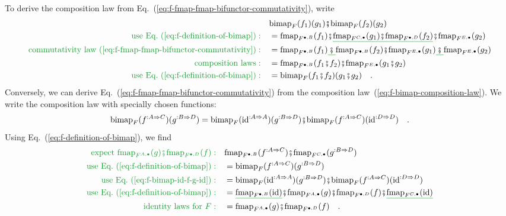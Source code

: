 To derive the composition law from Eq.~(\ref{eq:f-fmap-fmap-bifunctor-commutativity}),
write
\begin{align*}
 & \text{bimap}_{F}(f_{1})(g_{1})\bef\text{bimap}_{F}(f_{2})(g_{2})\\
{\color{greenunder}\text{use Eq.~(\ref{eq:f-definition-of-bimap})}:}\quad & =\text{fmap}_{F^{\bullet,B}}(f_{1})\bef\gunderline{\text{fmap}_{F^{C,\bullet}}(g_{1})\bef\text{fmap}_{F^{\bullet,D}}(f_{2})}\bef\text{fmap}_{F^{E,\bullet}}(g_{2})\\
{\color{greenunder}\text{commutativity law~(\ref{eq:f-fmap-fmap-bifunctor-commutativity})}:}\quad & =\text{fmap}_{F^{\bullet,B}}(f_{1})\gunderline{\,\bef\,}\text{fmap}_{F^{\bullet,B}}(f_{2})\bef\text{fmap}_{F^{E,\bullet}}(g_{1})\gunderline{\,\bef\,}\text{fmap}_{F^{E,\bullet}}(g_{2})\\
{\color{greenunder}\text{composition laws}:}\quad & =\text{fmap}_{F^{\bullet,B}}(f_{1}\bef f_{2})\bef\text{fmap}_{F^{E,\bullet}}(g_{1}\bef g_{2})\\
{\color{greenunder}\text{use Eq.~(\ref{eq:f-definition-of-bimap})}:}\quad & =\text{bimap}_{F}(f_{1}\bef f_{2})(g_{1}\bef g_{2})\quad.
\end{align*}
Conversely, we can derive Eq.~(\ref{eq:f-fmap-fmap-bifunctor-commutativity})
from the composition law~(\ref{eq:f-bimap-composition-law}). We
write the composition law with specially chosen functions:
\begin{equation}
\text{bimap}_{F}(f^{:A\Rightarrow C})(g^{:B\Rightarrow D})=\text{bimap}_{F}(\text{id}^{:A\Rightarrow A})(g^{:B\Rightarrow D})\bef\text{bimap}_{F}(f^{:A\Rightarrow C})(\text{id}^{:D\Rightarrow D})\quad.\label{eq:f-bimap-id-f-g-id}
\end{equation}
Using Eq.~(\ref{eq:f-definition-of-bimap}), we find
\begin{align*}
{\color{greenunder}\text{expect }\text{fmap}_{F^{A,\bullet}}(g)\bef\text{fmap}_{F^{\bullet,D}}(f):}\quad & \text{fmap}_{F^{\bullet,B}}(f^{:A\Rightarrow C})\bef\text{fmap}_{F^{C,\bullet}}(g^{:B\Rightarrow D})\\
{\color{greenunder}\text{use Eq.~(\ref{eq:f-definition-of-bimap})}:}\quad & =\text{bimap}_{F}(f^{:A\Rightarrow C})(g^{:B\Rightarrow D})\\
{\color{greenunder}\text{use Eq.~(\ref{eq:f-bimap-id-f-g-id})}:}\quad & =\text{bimap}_{F}(\text{id}^{:A\Rightarrow A})(g^{:B\Rightarrow D})\bef\text{bimap}_{F}(f^{:A\Rightarrow C})(\text{id}^{:D\Rightarrow D})\\
{\color{greenunder}\text{use Eq.~(\ref{eq:f-definition-of-bimap})}:}\quad & =\gunderline{\text{fmap}_{F^{\bullet,B}}(\text{id})}\bef\text{fmap}_{F^{A,\bullet}}(g)\bef\text{fmap}_{F^{\bullet,D}}(f)\bef\gunderline{\text{fmap}_{F^{C,\bullet}}(\text{id})}\\
{\color{greenunder}\text{identity laws for }F:}\quad & =\text{fmap}_{F^{A,\bullet}}(g)\bef\text{fmap}_{F^{\bullet,D}}(f)\quad.
\end{align*}

